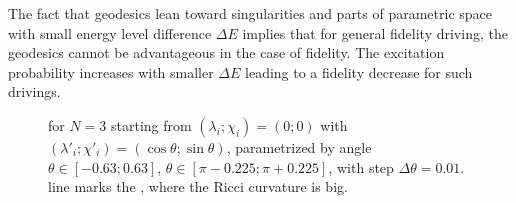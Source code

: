 The fact that geodesics lean toward singularities and parts of parametric space with small energy level difference $\Delta E$ implies that for general fidelity driving, the geodesics cannot be advantageous in the case of fidelity. The excitation probability increases with smaller $\Delta E$ leading to a fidelity decrease for such drivings.


\begin{figure}[H]
    \centering
    \vspace{-10pt}\caption{ for $N=3$ starting from $(\lambda_i;\chi_i)=(0;0)$ with $(\lambda'_i;\chi'_i)=(\cos\theta;\sin\theta)$, parametrized by angle $\theta\in [-0.63;0.63]$, $\theta\in [\pi-0.225;\pi+0.225]$, with step $\Delta\theta=0.01$.  line marks the , where the Ricci curvature is big.}
    \label{fig:N=3_geodesics}    
\end{figure}



